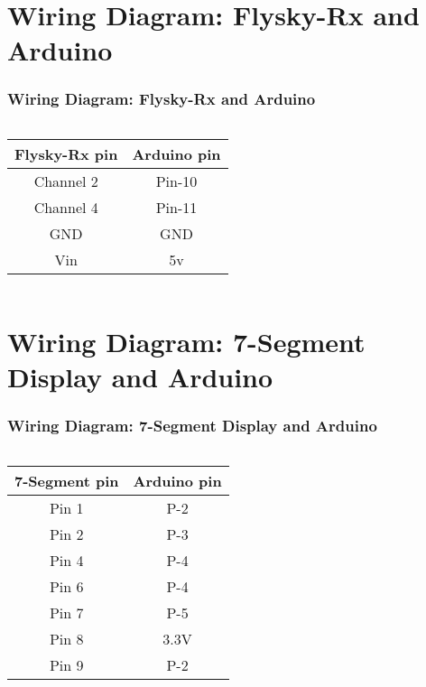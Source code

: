 \documentclass{beamer}
\begin{document}
\section{Wiring Diagram: Flysky-Rx and Arduino}
\begin{frame}
\frametitle{Wiring Diagram: Flysky-Rx and Arduino}
\begin{columns}
  
  \begin{tabular} { | c  | c  |  }
\hline
\textbf{Flysky-Rx pin} & \textbf{Arduino pin} \\
\hline
Channel 2 & Pin-10  \\
\hline
Channel 4 & Pin-11\\
\hline
GND & GND  \\
\hline
Vin & 5v\\
\hline
\end{tabular}
  
\end{columns}

\end{frame}


\section{Wiring Diagram: 7-Segment Display and Arduino}
\begin{frame}
\frametitle{Wiring Diagram: 7-Segment Display and Arduino}
\begin{columns}
  
  \begin{tabular} { | c  | c  |  }
\hline
\textbf{7-Segment pin} & \textbf{Arduino pin} \\
\hline
Pin 1 & P-2\\
\hline
Pin 2 & P-3\\
\hline
Pin 4 & P-4\\
\hline
Pin 6 & P-4\\
\hline
Pin 7 & P-5  \\
\hline
Pin 8 & 3.3V\\
\hline
Pin 9 & P-2\\
\hline

\end{tabular}


  
 
  
\end{columns}



\end{frame}
\end{document}
